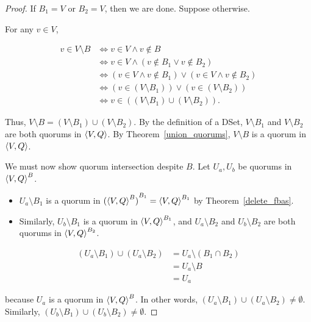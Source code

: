 \documentclass[12pt, psamsfonts]{amsart}
\theoremstyle{definition}
\theoremstyle{remark}
\numberwithin{equation}{section}
\begin{document}
\begin{proof}
	If $B_1 = V$ or $B_2 = V$, then we are done.
	Suppose otherwise.

	For any $v \in V$,

	\begin{align*}
	  v \in V \setminus B
		&\iff v \in V \land v \notin B \\
		&\iff v \in V \land (v \notin B_1 \lor v \notin B_2) \\
		&\iff (v \in V \land v \notin B_1) \lor (v \in V \land v \notin B_2) \\
		&\iff (v \in (V \setminus B_1)) \lor (v \in (V \setminus B_2)) \\
		&\iff v \in ((V \setminus B_1) \cup (V \setminus B_2)).
	\end{align*}

	Thus, $V \setminus B = (V \setminus B_1) \cup (V \setminus B_2)$.
	By the definition of a DSet, $V \setminus B_1$ and $V \setminus B_2$ are both quorums in $\ev{V, Q}$.
	By Theorem~\ref{union_quorums}, $V \setminus B$ is a quorum in $\ev{V, Q}$.

	We must now show quorum intersection despite $B$.
	Let $U_a, U_b$ be quorums in $\ev{V, Q}^B$.

	\begin{itemize}
		\item
            $U_a \setminus B_1$ is a quorum in ${(\ev{V, Q}^B)}^{B_1} = \ev{V, Q}^{B_1}$ by Theorem~\ref{delete_fbas}.
		\item
			Similarly, $U_b \setminus B_1$ is a quorum in $\ev{V, Q}^{B_1}$, and $U_a \setminus B_2$ and $U_b \setminus B_2$ are both quorums in $\ev{V, Q}^{B_2}$.
	\end{itemize}

	\begin{align*}
	  (U_a \setminus B_1) \cup (U_a \setminus B_2)
		&= U_a \setminus (B_1 \cap B_2) \\
		&= U_a \setminus B \\
		&= U_a
	\end{align*}

	because $U_a$ is a quorum in $\ev{V, Q}^B$.
	In other words, $(U_a \setminus B_1) \cup (U_a \setminus B_2) \ne \emptyset$.
	Similarly, $(U_b \setminus B_1) \cup (U_b \setminus B_2) \ne \emptyset$.


\end{proof}
\end{document}
